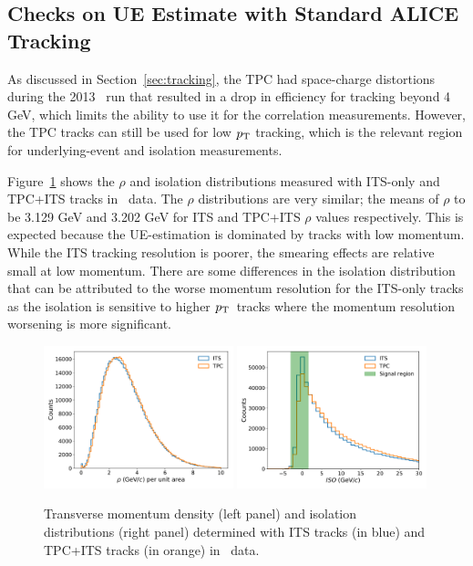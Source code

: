 \subsection{Checks on UE Estimate with Standard ALICE Tracking}
As discussed in Section~\ref{sec:tracking}, the TPC had space-charge distortions during the 2013 \pPb~run that resulted in a drop in efficiency for tracking beyond 4 GeV, which limits the ability to use it for the correlation measurements. However, the TPC tracks can still be used for low $p_{\mathrm{T}}$ tracking, which is the relevant region for underlying-event and isolation measurements. 

Figure~\ref{fig:pPb_its_tpc_rho} shows the $\rho$  and isolation distributions measured with ITS-only and TPC+ITS tracks in \pPb~data. The $\rho$ distributions are very similar; the means of $\rho$ to be 3.129 GeV and 3.202 GeV for ITS and TPC+ITS $\rho$ values respectively. This is expected because the UE-estimation is dominated by tracks with low momentum. While the ITS tracking resolution is poorer, the smearing effects are relative small at low momentum. There are some differences in the isolation distribution that can be attributed to the worse momentum resolution for the ITS-only tracks as the isolation is sensitive to higher $p_{\mathrm{T}}$~tracks where the momentum resolution worsening is more significant. 

\begin{figure}[hbtp]
	\center
	\includegraphics[width=0.49\textwidth]{Checks_Systematics/UEestimate_Skimmed_13def.pdf}
		\includegraphics[width=0.49\textwidth]{Checks_Systematics/IsolationTPC_Skimmed_13def.pdf}
	\caption{Transverse momentum density (left panel) and isolation distributions (right panel) determined with ITS tracks (in blue) and TPC+ITS tracks (in orange) in \pPb~data.}
	\label{fig:pPb_its_tpc_rho}
\end{figure}

